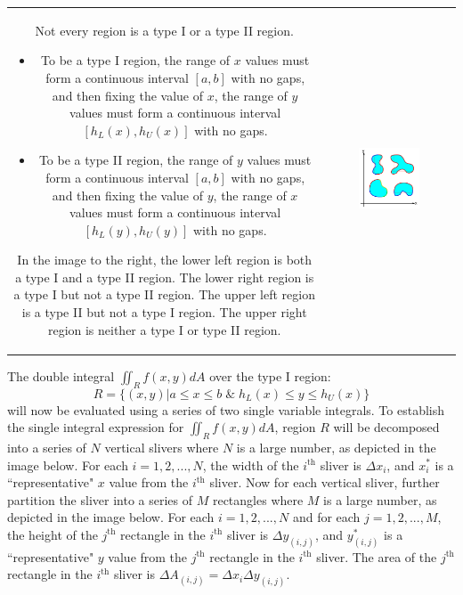 \documentclass{article}
\begin{document}
\begin{tabular}{cc}
\parbox{0.5\textwidth}{
Not every region is a type I or a type II region. 
\begin{itemize}
\item To be a type I region, the range of \(x\) values must form a continuous interval \([a, b]\) with no gaps, and then fixing the value of \(x\), the range of \(y\) values must form a continuous interval \([h_L(x), h_U(x)]\) with no gaps. 
\item To be a type II region, the range of \(y\) values must form a continuous interval \([a, b]\) with no gaps, and then fixing the value of \(y\), the range of \(x\) values must form a continuous interval \([h_L(y), h_U(y)]\) with no gaps. 
\end{itemize}
In the image to the right, the lower left region is both a type I and a type II region. The lower right region is a type I but not a type II region. The upper left region is a type II but not a type I region. The upper right region is neither a type I or type II region.
} & \parbox{0.5\textwidth}{
\includegraphics[width = 0.5\textwidth]{Cartesian_Regions_Type_I_II}
}
\end{tabular}

The double integral \(\iint_R f(x,y)dA\) over the type I region:
\[R = \{(x,y) | a \leq x \leq b \;\&\; h_L(x) \leq y \leq h_U(x)\}\]
will now be evaluated using a series of two single variable integrals. To establish the single integral expression for \(\iint_R f(x,y)dA\), region \(R\) will be decomposed into a series of \(N\) vertical slivers where \(N\) is a large number, as depicted in the image below. For each \(i = 1, 2, ..., N\), the width of the \(i^{\text{th}}\) sliver is \(\Delta x_i\), and \(x_i^*\) is a ``representative" \(x\) value from the \(i^{\text{th}}\) sliver. Now for each vertical sliver, further partition the sliver into a series of \(M\) rectangles where \(M\) is a large number, as depicted in the image below. For each \(i = 1, 2, ..., N\) and for each \(j = 1, 2, ..., M\), the height of the \(j^{\text{th}}\) rectangle in the \(i^{\text{th}}\) sliver is \(\Delta y_{(i,j)}\), and \(y_{(i,j)}^*\) is a ``representative" \(y\) value from the \(j^{\text{th}}\) rectangle in the \(i^{\text{th}}\) sliver. The area of the \(j^{\text{th}}\) rectangle in the \(i^{\text{th}}\) sliver is \(\Delta A_{(i,j)} = \Delta x_i \Delta y_{(i,j)}\). 
\end{document}

